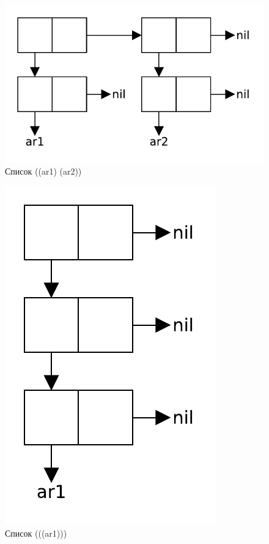 \begin{figure}[H]
    \centering
    \includegraphics[scale=0.60]{data/pdf/02-02.pdf}
    \caption{Список ((ar1) (ar2))}
\end{figure}

\begin{figure}[H]
    \centering
    \includegraphics[scale=0.60]{data/pdf/02-03.pdf}
    \caption{Список (((ar1)))}
\end{figure}
